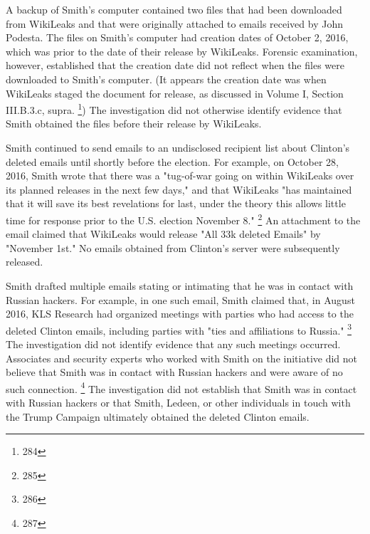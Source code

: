 A backup of Smith's computer contained two files that had been downloaded from WikiLeaks and that were originally attached to emails received by John Podesta.
The files on Smith's computer had creation dates of October 2, 2016, which was prior to the date of their release by WikiLeaks.
Forensic examination, however, established that the creation date did not reflect when the files were downloaded to Smith's computer.
(It appears the creation date was when WikiLeaks staged the document for release, as discussed in Volume I, Section III.B.3.c, supra.%
\footnote{284})
The investigation did not otherwise identify evidence that Smith obtained the files before their release by WikiLeaks.

Smith continued to send emails to an undisclosed recipient list about Clinton's deleted emails until shortly before the election.
For example, on October 28, 2016, Smith wrote that there was a "tug-of-war going on within WikiLeaks over its planned releases in the next few days," and that WikiLeaks "has maintained that it will save its best revelations for last, under the theory this allows little time for response prior to the U.S. election November 8."%
\footnote{285}
An attachment to the email claimed that WikiLeaks would release "All 33k deleted Emails" by "November 1st."
No emails obtained from Clinton's server were subsequently released.

Smith drafted multiple emails stating or intimating that he was in contact with Russian hackers.
For example, in one such email, Smith claimed that, in August 2016, KLS Research had organized meetings with parties who had access to the deleted Clinton emails, including parties with "ties and affiliations to Russia."%
\footnote{286}
The investigation did not identify evidence that any such meetings occurred.
Associates and security experts who worked with Smith on the initiative did not believe that Smith was in contact with Russian hackers and were aware of no such connection.%
\footnote{287}
The investigation did not establish that Smith was in contact with Russian hackers or that Smith, Ledeen, or other individuals in touch with the Trump Campaign ultimately obtained the deleted Clinton emails.

\hr

